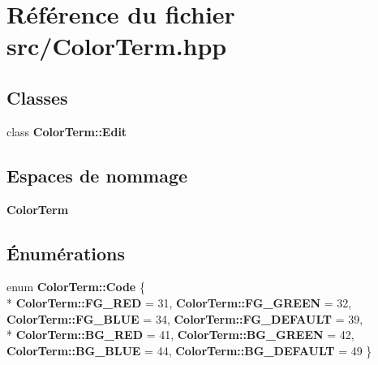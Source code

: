 \section{Référence du fichier src/\-Color\-Term.hpp}
\label{_color_term_8hpp}
\subsection*{Classes}
\begin{DoxyCompactItemize}
\item 
class {\bf Color\-Term\-::\-Edit}
\end{DoxyCompactItemize}
\subsection*{Espaces de nommage}
\begin{DoxyCompactItemize}
\item 
{\bf Color\-Term}
\end{DoxyCompactItemize}
\subsection*{Énumérations}
\begin{DoxyCompactItemize}
\item 
enum {\bf Color\-Term\-::\-Code} \{ \\*
{\bf Color\-Term\-::\-F\-G\-\_\-\-R\-E\-D} = 31, 
{\bf Color\-Term\-::\-F\-G\-\_\-\-G\-R\-E\-E\-N} = 32, 
{\bf Color\-Term\-::\-F\-G\-\_\-\-B\-L\-U\-E} = 34, 
{\bf Color\-Term\-::\-F\-G\-\_\-\-D\-E\-F\-A\-U\-L\-T} = 39, 
\\*
{\bf Color\-Term\-::\-B\-G\-\_\-\-R\-E\-D} = 41, 
{\bf Color\-Term\-::\-B\-G\-\_\-\-G\-R\-E\-E\-N} = 42, 
{\bf Color\-Term\-::\-B\-G\-\_\-\-B\-L\-U\-E} = 44, 
{\bf Color\-Term\-::\-B\-G\-\_\-\-D\-E\-F\-A\-U\-L\-T} = 49
 \}
\end{DoxyCompactItemize}
